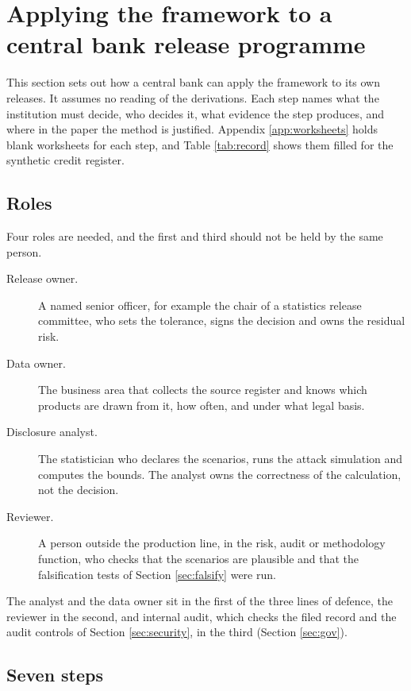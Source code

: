 \section{Applying the framework to a central bank release programme}\label{sec:apply}

This section sets out how a central bank can apply the framework to its own
releases. It assumes no reading of the derivations. Each step names what the
institution must decide, who decides it, what evidence the step produces, and
where in the paper the method is justified. Appendix \ref{app:worksheets} holds
blank worksheets for each step, and Table \ref{tab:record} shows them filled for
the synthetic credit register.

\subsection{Roles}\label{sec:apply-roles}

Four roles are needed, and the first and third should not be held by the same
person.
\begin{description}
\item[Release owner.] A named senior officer, for example the chair of a
statistics release committee, who sets the tolerance, signs the decision and owns
the residual risk.
\item[Data owner.] The business area that collects the source register and knows
which products are drawn from it, how often, and under what legal basis.
\item[Disclosure analyst.] The statistician who declares the scenarios, runs the
attack simulation and computes the bounds. The analyst owns the correctness of the
calculation, not the decision.
\item[Reviewer.] A person outside the production line, in the risk, audit or
methodology function, who checks that the scenarios are plausible and that the
falsification tests of Section \ref{sec:falsify} were run.
\end{description}
The analyst and the data owner sit in the first of the three lines of defence,
the reviewer in the second, and internal audit, which checks the filed record
and the audit controls of Section \ref{sec:security}, in the third (Section
\ref{sec:gov}).


\subsection{Seven steps}\label{sec:apply-steps}

